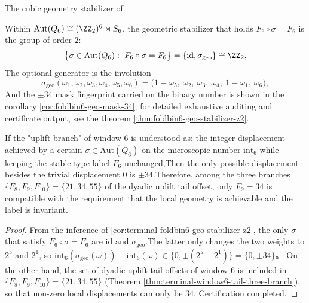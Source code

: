 \begin{enumerate}
The cubic geometry stabilizer of \begin{corollary}\label{cor:terminal-foldbin6-geo-stabilizer-z2}Within \(\mathrm{Aut}(Q_6)\cong (\ZZ_2)^6\rtimes S_6\), the geometric stabilizer that holds \(F_6\circ\sigma=F_6\) is the group of order \(2\):  \[
  \bigl\{\sigma\in\mathrm{Aut}(Q_6):\ F_6\circ\sigma=F_6\bigr\}=\{\mathrm{id},\sigma_{\mathrm{geo}}\}\cong \ZZ_2,
  \]
The optional generator is the involution  \[
  \sigma_{\mathrm{geo}}(\omega_1,\omega_2,\omega_3,\omega_4,\omega_5,\omega_6)=\bigl(1-\omega_5,\ \omega_2,\ \omega_3,\ \omega_4,\ 1-\omega_1,\ \omega_6\bigr),
  \]
And the \(\pm 34\) mask fingerprint carried on the binary number is shown in the corollary \ref{cor:foldbin6-geo-mask-34}; for detailed exhaustive auditing and certificate output, see the theorem \ref{thm:foldbin6-geo-stabilizer-z2}.  \end{corollary}

\begin{corollary}[Geometric realizability judgment: window-\(6\)’s uplift \texorpdfstring{XPH0X}{delta}-branch only allows \texorpdfstring{XPH1X}{δ=34}]\label{cor:terminal-window6-local-uplift-admissibility}If the "uplift branch" of window-\(6\) is understood as: the integer displacement achieved by a certain \(\sigma\in\mathrm{Aut}(Q_6)\) on the microscopic number \(\mathrm{int}_6\) while keeping the stable type label \(F_6\) unchanged,Then the only possible displacement besides the trivial displacement \(0\) is \(\pm 34\).Therefore, among the three branches \(\{F_8,F_9,F_{10}\}=\{21,34,55\}\) of the dyadic uplift tail offset, only \(F_9=34\) is compatible with the requirement that the local geometry is achievable and the label is invariant.  \end{corollary}
  \begin{proof}
From the inference of \ref{cor:terminal-foldbin6-geo-stabilizer-z2}, the only \(\sigma\) that satisfy \(F_6\circ\sigma=F_6\) are \(\mathrm{id}\) and \(\sigma_{\mathrm{geo}}\).The latter only changes the two weights to \(2^5\) and \(2^1\), so  \(
  \mathrm{int}_6(\sigma_{\mathrm{geo}}(\omega))-\mathrm{int}_6(\omega)\in\{0,\pm(2^5+2^1)\}=\{0,\pm 34\}
  \)。
On the other hand, the set of dyadic uplift tail offsets of window-\(6\) is included in \(\{F_8,F_9,F_{10}\}=\{21,34,55\}\) (Theorem \ref{thm:terminal-window6-tail-three-branch}), so that non-zero local displacements can only be \(34\). Certification completed.  \end{proof}


\end{enumerate}
